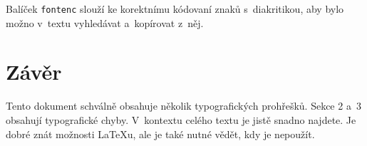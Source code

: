 \documentclass[hidelinks, 10pt, twocolumn]{article}
\begin{document}

Balíček \verb|fontenc| slouží ke korektnímu kódovaní znaků s~diakritikou, aby bylo možno v~textu vyhledávat a~kopírovat z~něj.

\section{Závěr}

Tento dokument schválně obsahuje několik typografických prohřešků.
Sekce 2 a~3 obsahují typografické chyby.
V~kontextu celého textu je jistě snadno najdete.
Je dobré znát možnosti \LaTeX{}u, ale je také nutné vědět, kdy je nepoužít.


    
\end{document}
